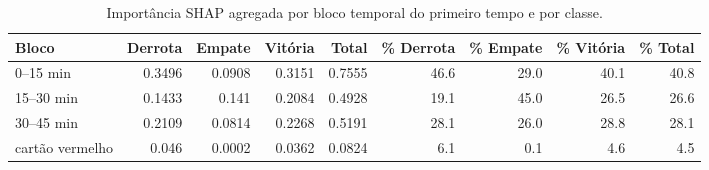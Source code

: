 \begin{table}[htbp]
\centering
\caption{Importância SHAP agregada por bloco temporal do primeiro tempo e por classe.}
\label{tab:wp4-shap-bloco}
\small
\begin{tabular}{lrrrrrrrr}
\toprule
Bloco & Derrota & Empate & Vitória & Total & \% Derrota & \% Empate & \% Vitória & \% Total \\
\midrule
0–15 min & 0.3496 & 0.0908 & 0.3151 & 0.7555 & 46.6 & 29.0 & 40.1 & 40.8 \\
15–30 min & 0.1433 & 0.141 & 0.2084 & 0.4928 & 19.1 & 45.0 & 26.5 & 26.6 \\
30–45 min & 0.2109 & 0.0814 & 0.2268 & 0.5191 & 28.1 & 26.0 & 28.8 & 28.1 \\
cartão vermelho & 0.046 & 0.0002 & 0.0362 & 0.0824 & 6.1 & 0.1 & 4.6 & 4.5 \\
\bottomrule
\end{tabular}
\end{table}
